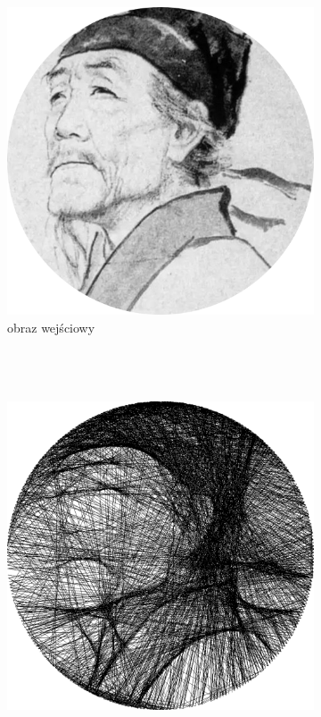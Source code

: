     	\begin{figure}[H] 
        \centering
        \begin{subfigure}{0.24\textwidth}
            \centering
            \includegraphics[width = \textwidth]{img/6-comp/dufu_original_c10_inv0.png}
            \caption{obraz wejściowy\\\hphantom{ }\\\hphantom{ }\\\hphantom{ }\\\hphantom{ }}
            \label{comp-comp-dufu-gogh-a}
        \end{subfigure}
        \begin{subfigure}{0.24\textwidth}
            \centering
            \includegraphics[width = \textwidth]{img/6-comp/dufu_xiaonan_.png}

\end{subfigure}
\end{figure}

